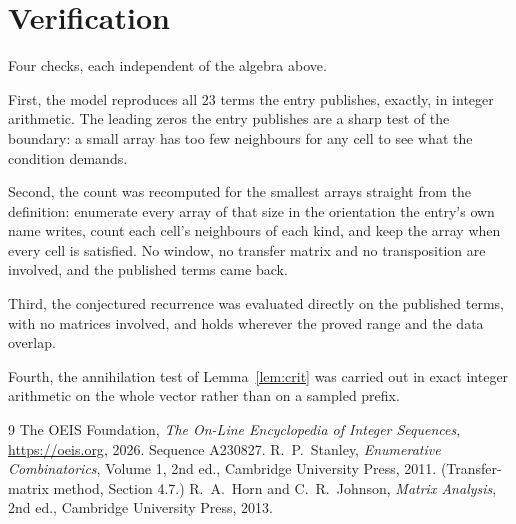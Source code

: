 \documentclass[11pt,a4paper]{article}
\theoremstyle{plain}
\theoremstyle{definition}
\begin{document}
\section{Verification}

Four checks, each independent of the algebra above.

First, the model reproduces all $23$ terms the entry publishes, exactly, in integer
arithmetic. The leading zeros the entry publishes are a sharp test of the boundary: a small
array has too few neighbours for any cell to see what the condition demands.

Second, the count was recomputed for the smallest arrays straight from the definition:
enumerate every array of that size in the orientation the entry's own name writes, count each
cell's neighbours of each kind, and keep the array when every cell is satisfied. No window, no
transfer matrix and no transposition are involved, and the published terms came back.

Third, the conjectured recurrence was evaluated directly on the published terms, with no
matrices involved, and holds wherever the proved range and the data overlap.

Fourth, the annihilation test of Lemma~\ref{lem:crit} was carried out in exact integer
arithmetic on the whole vector rather than on a sampled prefix.

\begin{thebibliography}{9}
 The OEIS Foundation, \emph{The On-Line Encyclopedia of Integer
Sequences}, \url{https://oeis.org}, 2026. Sequence A230827.
 R.~P.~Stanley, \emph{Enumerative Combinatorics}, Volume 1, 2nd ed.,
Cambridge University Press, 2011. (Transfer-matrix method, Section 4.7.)
 R.~A.~Horn and C.~R.~Johnson, \emph{Matrix Analysis}, 2nd ed., Cambridge
University Press, 2013.
\end{thebibliography}
\end{document}
